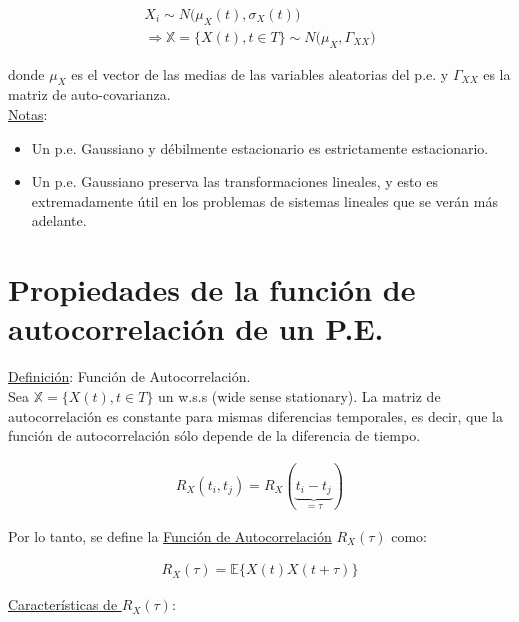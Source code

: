 \begin{align*}
    X_i \sim N\big(\mu_X(t), \sigma_X(t)\big)\\
    \Longrightarrow \mathbb{X} = \{X(t), t \in T\}\sim N\big(\mu_X,\Gamma_{XX}\big)
\end{align*}

donde $\mu_X$ es el vector de las medias de las variables aleatorias del p.e. y $\Gamma_{XX}$ es la matriz de auto-covarianza. \\

\underline{Notas}:
\begin{itemize}
    \item Un p.e. Gaussiano y débilmente estacionario es estrictamente estacionario.
    \item Un p.e. Gaussiano preserva las transformaciones lineales, y esto es extremadamente útil en los problemas de sistemas lineales que se verán más adelante.
\end{itemize}

\section{Propiedades de la función de autocorrelación de un P.E.}

\underline{Definición}: Función de Autocorrelación.\\

Sea $\mathbb{X} = \{X(t), t \in T\}$ un w.s.s (wide sense stationary). La matriz de autocorrelación es constante para mismas diferencias temporales, es decir, que la función de autocorrelación sólo depende de la diferencia de tiempo.

\begin{align*}
    R_{X}(t_i,t_j) = R_X(\underbrace{t_i - t_j}_{= \tau})
\end{align*}

Por lo tanto, se define la \underline{Función de Autocorrelación} $R_X(\tau)$ como:

\begin{align*}
    R_{X}(\tau)=\mathbb{E}\{X(t)X(t+\tau)\}
\end{align*}

\underline{Características de $R_{X}(\tau)$}:

